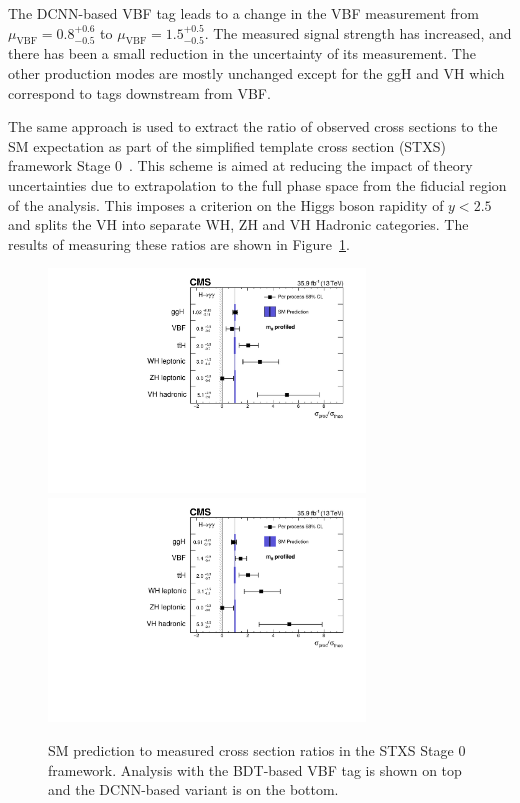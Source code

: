 The DCNN-based VBF tag leads to a change in the VBF measurement from $\mu_{\mathrm{VBF}}=0.8^{+0.6}_{-0.5}$ to $\mu_{\mathrm{VBF}}=1.5^{+0.5}_{-0.5}$.
The measured signal strength has increased, and there has been a small reduction in the uncertainty of its measurement.
The other production modes are mostly unchanged except for the ggH and VH which correspond to tags downstream from VBF.


The same approach is used to extract the ratio of observed cross sections to the SM expectation as part of the simplified template cross section (STXS) framework Stage 0~\cite{LHCHXS}.
This scheme is aimed at reducing the impact of theory uncertainties due to extrapolation to the full phase space from the fiducial region of the analysis. 
This imposes a criterion on the Higgs boson rapidity of $y<2.5$ and splits the VH into separate WH, ZH and VH Hadronic categories. 
The results of measuring these ratios are shown in Figure~\ref{fig:stats_results:stxs}.
\begin{figure}[h!]
    \begin{center}
        \includegraphics[width=0.75\textwidth]{figures/stats_results/CMS-HIG-16-040_Figure_018.pdf}
        \includegraphics[width=0.75\textwidth]{figures/stats_results/STXSPerProcessMuProfileMH_ReMap.pdf}
    \end{center}
    \caption{SM prediction to measured cross section ratios in the STXS Stage 0 framework. Analysis with the BDT-based VBF tag is shown on top and the DCNN-based variant is on the bottom.}
        \label{fig:stats_results:stxs}
\end{figure}

